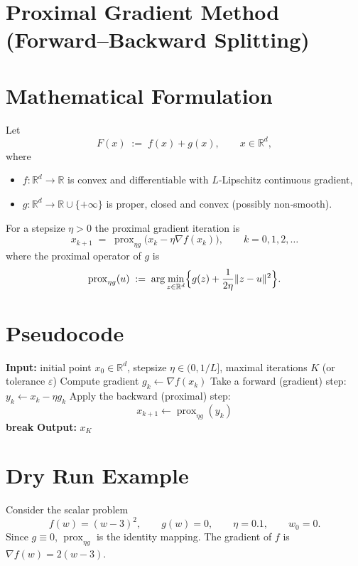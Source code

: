 \documentclass{article}
\newcommand{\prox}{\operatorname{prox}}
\newcommand{\R}{\mathbb{R}}
\begin{document}
\section*{Proximal Gradient Method (Forward–Backward Splitting)}

\section*{Mathematical Formulation}
Let 
\[
F(x)\;:=\;f(x)+g(x),\qquad x\in\R^{d},
\]
where 
\begin{itemize}
  \item $f:\R^{d}\!\to\!\R$ is convex and differentiable with $L$‑Lipschitz continuous gradient,
  \item $g:\R^{d}\!\to\!\R\cup\{+\infty\}$ is proper, closed and convex (possibly non‑smooth).
\end{itemize}
For a stepsize $\eta>0$ the proximal gradient iteration is
\begin{equation}
\boxed{
x_{k+1}\;=\;\prox_{\eta g}\!\bigl(x_{k}-\eta\nabla f(x_{k})\bigr)},\qquad k=0,1,2,\dots
\label{eq:pg}
\end{equation}
where the proximal operator of $g$ is
\[
\prox_{\eta g}(u)\;:=\;\arg\min_{z\in\R^{d}}\Bigl\{ g(z)+\frac{1}{2\eta}\|z-u\|^{2}\Bigr\}.
\]

\section*{Pseudocode}
\begin{algorithm}[H]
\caption{Proximal Gradient Method}
\begin{algorithmic}[1]
\STATE \textbf{Input:} initial point $x_{0}\in\R^{d}$, stepsize $\eta\in(0,1/L]$,
          maximal iterations $K$ (or tolerance $\varepsilon$)
    \STATE Compute gradient $g_{k}\gets\nabla f(x_{k})$
    \STATE Take a forward (gradient) step: $y_{k}\gets x_{k}-\eta g_{k}$
    \STATE Apply the backward (proximal) step:
    \[
        x_{k+1}\gets \prox_{\eta g}(y_{k})
    \]
        \STATE \textbf{break}
    \ENDIF
\ENDFOR
\STATE \textbf{Output:} $x_{K}$
\end{algorithmic}
\end{algorithm}

\section*{Dry Run Example}
Consider the scalar problem
\[
f(w)=(w-3)^{2},\qquad g(w)=0,\qquad \eta=0.1,\qquad w_{0}=0.
\]
Since $g\equiv0$, $\prox_{\eta g}$ is the identity mapping.  
The gradient of $f$ is $\nabla f(w)=2(w-3)$.  
\end{document}
